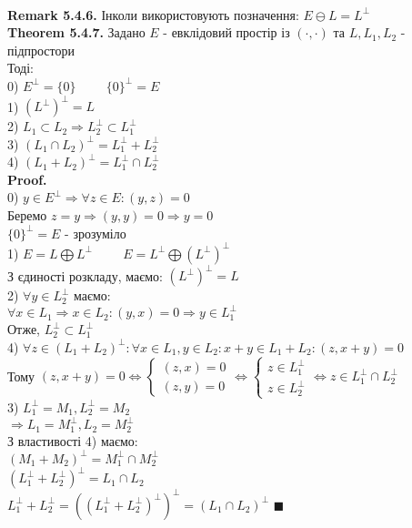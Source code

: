 \documentclass[a4paper, 14pt]{extarticle}
\def\rm#1{\textbf{Remark {#1}}}
\def\th#1{\textbf{Theorem {#1}}}
\def\proof{\textbf{Proof.}\\}
\def\bigline{\vspace{5mm}\\}
\def\qed{$\blacksquare$}
\begin{document}
\bigline
\rm{5.4.6.} Інколи використовують позначення: $E \ominus L = L^{\perp}$
\bigline
\th{5.4.7.} Задано $E$ - евклідовий простір із $(\cdot, \cdot)$ та $L, L_1,L_2$ - підпростори\\
Тоді:\\
0) $E^{\perp} = \{0\} \hspace{1cm} \{0\}^{\perp} = E$\\
1) $(L^{\perp})^{\perp} = L$\\
2) $L_1 \subset L_2 \Rightarrow L_2^{\perp} \subset L_1^{\perp}$\\
3) $(L_1 \cap L_2)^{\perp} = L_1^{\perp} + L_2^{\perp}$\\
4) $(L_1+L_2)^{\perp} = L_1^{\perp} \cap L_2^{\perp}$\\
\proof
0) $y \in E^{\perp} \Rightarrow \forall z \in E: (y,z) = 0$\\
Беремо $z = y \Rightarrow (y,y) = 0 \Rightarrow y = 0$\\
$\{0\}^{\perp} = E$ - зрозуміло
\bigline
1) $E = L \bigoplus L^{\perp} \hspace{1cm} E = L^{\perp} \bigoplus (L^{\perp})^{\perp}$\\
З єдиності розкладу, маємо: $(L^{\perp})^{\perp} = L$
\bigline
2) $\forall y \in L_2^{\perp}$ маємо:\\
$\forall x \in L_1 \Rightarrow x \in L_2: (y,x) = 0 \Rightarrow y \in L_1^{\perp}$\\
Отже, $L_2^{\perp} \subset L_1^{\perp}$
\bigline
4) $\forall z \in (L_1+L_2)^{\perp}: \forall x \in L_1, y \in L_2: x+y \in L_1+L_2: (z,x+y) = 0$\\
Тому $(z,x+y) = 0 \iff \begin{cases} (z,x) = 0 \\ (z,y) = 0 \end{cases} \iff \begin{cases} z \in L_1^{\perp} \\ z \in L_2^{\perp} \end{cases} \iff z \in L_1^{\perp} \cap L_2^{\perp}$
\bigline
3) $L_1^{\perp} = M_1, L_2^{\perp} = M_2$\\
$\Rightarrow L_1 = M_1^{\perp}, L_2 = M_2^{\perp}$\\
З властивості 4) маємо:\\
$(M_1+M_2)^{\perp} = M_1^{\perp} \cap M_2^{\perp}$\\
$(L_1^{\perp} + L_2^{\perp})^{\perp} = L_1 \cap L_2$\\
$L_1^{\perp} + L_2^{\perp}=((L_1^{\perp} + L_2^{\perp})^{\perp})^{\perp} = (L_1 \cap L_2)^{\perp}$ \qed
\end{document}
